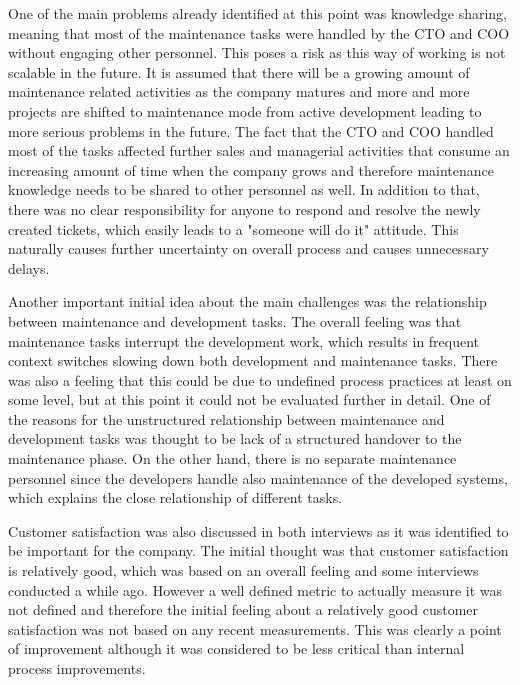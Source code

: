 One of the main problems already identified at this point was knowledge sharing, meaning that most of the maintenance tasks were handled by the CTO and COO without engaging
other personnel. This poses a risk as this way of working is not scalable in the future. It is assumed that there will be a growing amount of maintenance related
activities as the company matures and more and more projects are shifted to maintenance mode from active development leading to more serious problems in the future.
The fact that the CTO and COO handled most of the tasks
affected further sales and managerial activities that consume an increasing amount of time when the company grows and therefore maintenance knowledge needs to be shared
to other personnel as well. In addition to that, there was no clear responsibility for anyone to respond and resolve the newly created tickets, which easily leads to
a "someone will do it" attitude. This naturally causes further uncertainty on overall process and causes unnecessary delays.

Another important initial idea about the main challenges was the relationship between maintenance and development tasks. The overall feeling was that maintenance tasks
interrupt the development work, which results in frequent context switches slowing down both development and maintenance tasks. There was also a feeling that
this could be due to undefined process practices at least on some level, but at this point it could not be evaluated further in detail. One of the reasons for the
unstructured relationship between maintenance and development tasks was thought to be lack of a structured handover to the maintenance phase. On the other hand,
there is no separate maintenance personnel since the developers handle also maintenance of the developed systems, which explains the close relationship of different
tasks.

Customer satisfaction was also discussed in both interviews as it was identified to be important for the company. The initial thought was that customer satisfaction is
relatively good, which was based on an overall feeling and some interviews conducted a while ago. However a well defined metric to actually measure it was not defined and therefore
the initial feeling about a relatively good customer satisfaction was not based on any recent measurements. This was clearly a point of improvement although it was
considered to be less critical than internal process improvements.